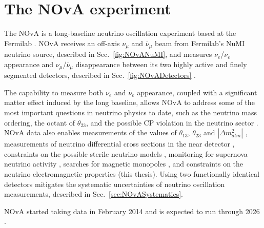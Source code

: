 \chapter{The NOvA experiment}\label{sec:NOvA}

The \gls{NOvA} \cite{NOvAWebsite} is a long-baseline neutrino oscillation experiment based at the \gls{Fermilab}
\cite{FNALWebsite}. \gls{NOvA} receives an off-axis $\nu_\mu$ and $\overline{\nu}_\mu$ beam from \gls{Fermilab}'s \gls{NuMI} neutrino source, described in Sec.~\ref{fig:NOvANuMI}, and measures $\nu_e$/$\overline{\nu}_e$ appearance and $\nu_\mu$/$\overline{\nu}_\mu$ disappearance between its two highly active and finely segmented detectors, described in Sec.~\ref{fig:NOvADetectors} \cite{PhysicsOfNOvA.pdf}. 

The capability to measure both $\nu_e$ and $\overline{\nu}_e$ appearance, coupled with a significant matter effect induced by the long baseline, allows \gls{NOvA} to address some of the most important questions in neutrino physics to date, such as the neutrino mass ordering, the octant of $\theta_{23}$, and the possible \gls{CP} violation in the neutrino sector \cite{PhysicsOfNOvA.pdf,NOvAStatusAndOutlook.pdf,FirstNOvAResult.pdf,2019NOvAFHCRHCResults.pdf,NOvAResults2021.pdf}. \gls{NOvA} data also enables measurements of the values of $\theta_{13}$, $\theta_{23}$ and $\left|\Delta m^2_{atm}\right|$ \cite{PhysicsOfNOvA.pdf}, measurements of neutrino differential cross sections in the near detector \cite{NOvANCPi0XSecMeasurement2019.pdf, NOvANumuCCXSexMeasurement2023.pdf, NOvANueCCXSecMeasurement2023.pdf, NOvANuMuCCPi0XSecMeasurement2023.pdf}, constraints on the possible sterile neutrino models \cite{NOvASterilesFHCResults2017.pdf, NOvASterilesFHCRHCResults2021.pdf}, monitoring for supernova neutrino activity \cite{NOvASupernovaMeasurements2020.pdf, NOvASupernovaCoincidenceMeasurements2021.pdf}, searches for magnetic monopoles \cite{NOvASlowMagMonopoles2021.pdf}, and constraints on the neutrino electromagnetic properties (this thesis). Using two functionally identical detectors mitigates the systematic uncertainties of neutrino oscillation measurements, described in Sec.~\ref{sec:NOvASystematics}.


\gls{NOvA} started taking data in February 2014 and is expected to run through 2026 \cite{NOvAHalfTimeOverview2022.pdf}.

